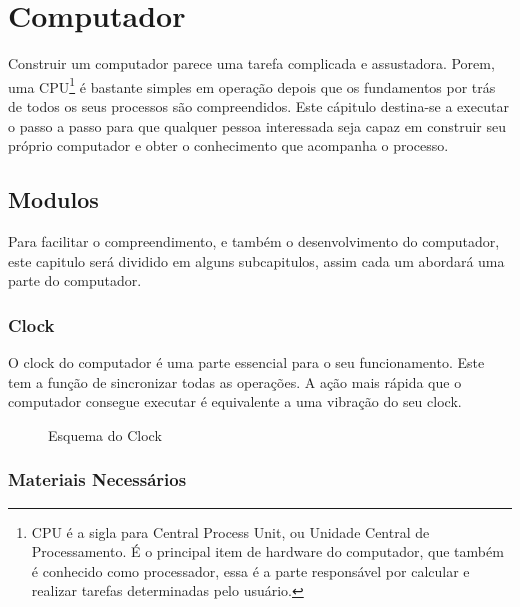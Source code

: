 \section{Computador} 
Construir um computador parece uma tarefa complicada e assustadora. Porem, uma CPU\footnote{CPU é a sigla para Central Process Unit, ou Unidade Central de Processamento. É o principal item de hardware do computador, que também é conhecido como processador, essa é a parte responsável por calcular e realizar tarefas determinadas pelo usuário.} é bastante simples em operação depois que os fundamentos por trás de todos os seus processos são compreendidos. Este cápitulo destina-se a executar o passo a passo para que qualquer pessoa interessada seja capaz em construir seu próprio computador e obter o conhecimento que acompanha o processo.
\subsection{Modulos}
Para facilitar o compreendimento, e também o desenvolvimento do computador, este capitulo será dividido em alguns subcapitulos, assim cada um abordará uma parte do computador. 
\subsubsection{Clock}
O clock do computador é uma parte essencial para o seu funcionamento. Este tem a função de sincronizar todas as operações. A ação mais rápida que o computador consegue executar é equivalente a uma vibração do seu clock.
\begin{figure}[h!] \centering 
  \caption{\label{fig:1} Esquema do Clock} 
\end{figure}
\subsubsection{Materiais Necessários}
\newpage